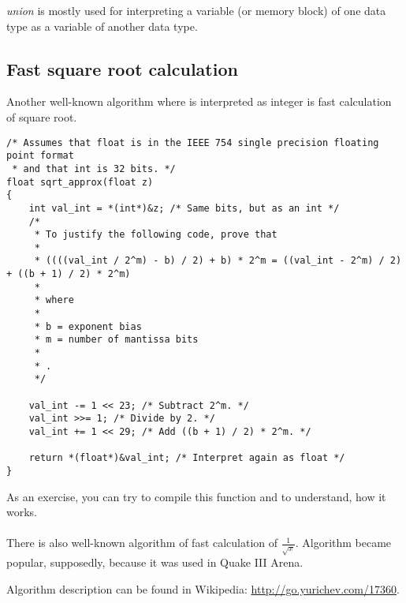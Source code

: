 
\CCpp \emph{union} is mostly used for interpreting a variable (or memory block) of one data type as a variable of another data type.





\subsection{Fast square root calculation}

Another well-known algorithm where \Tfloat is interpreted as integer is fast calculation of square root.

\begin{lstlisting}[caption=The source code is taken from Wikipedia: \url{https://en.wikipedia.org/wiki/Methods_of_computing_square_roots},style=customc]
/* Assumes that float is in the IEEE 754 single precision floating point format
 * and that int is 32 bits. */
float sqrt_approx(float z)
{
    int val_int = *(int*)&z; /* Same bits, but as an int */
    /*
     * To justify the following code, prove that
     *
     * ((((val_int / 2^m) - b) / 2) + b) * 2^m = ((val_int - 2^m) / 2) + ((b + 1) / 2) * 2^m)
     *
     * where
     *
     * b = exponent bias
     * m = number of mantissa bits
     *
     * .
     */
 
    val_int -= 1 << 23; /* Subtract 2^m. */
    val_int >>= 1; /* Divide by 2. */
    val_int += 1 << 29; /* Add ((b + 1) / 2) * 2^m. */
 
    return *(float*)&val_int; /* Interpret again as float */
}
\end{lstlisting}

As an exercise, you can try to compile this function and to understand, how it works. \\
\\
There is also well-known algorithm of fast calculation of $\frac{1}{\sqrt{x}}$.
Algorithm became popular, supposedly, because it was used in Quake III Arena.

Algorithm description can be found in Wikipedia: \url{http://go.yurichev.com/17360}.

